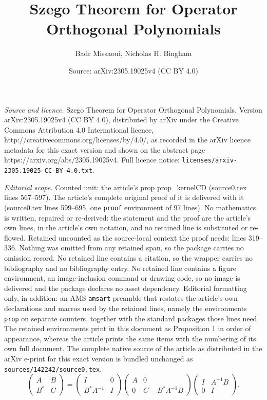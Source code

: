 \documentclass[10pt,a4paper]{amsart}
\title{Szego Theorem for Operator Orthogonal Polynomials}
\author{Badr Missaoui, Nicholas H. Bingham}
\date{Source: arXiv:2305.19025v4 (CC BY 4.0)}
\begin{document}
\maketitle

\noindent\emph{Source and licence.} Szego Theorem for Operator Orthogonal Polynomials. Version arXiv:2305.19025v4 (CC BY 4.0), distributed by arXiv under the Creative Commons Attribution 4.0 International licence, http://creativecommons.org/licenses/by/4.0/, as recorded in the arXiv licence metadata for this exact version and shown on the abstract page https://arxiv.org/abs/2305.19025v4. Full licence notice: \texttt{licenses/arxiv-2305.19025-CC-BY-4.0.txt}.\par\smallskip

\noindent\textit{Editorial scope.} Counted unit: the article's prop prop\_kernelCD (source0.tex lines 567--597). The article's complete original proof of it is delivered with it (source0.tex lines 599--695, one \texttt{proof} environment of 97 lines). No mathematics is written, repaired or re-derived: the statement and the proof are the article's own lines, in the article's own notation, and no retained line is substituted or re-flowed.  Retained uncounted as the source-local context the proof needs: lines 319--336.  Nothing was omitted from any retained span, so the package carries no omission record.  No retained line contains a citation, so the wrapper carries no bibliography and no bibliography entry.  No retained line contains a figure environment, an image-inclusion command or drawing code, so no image is delivered and the package declares no asset dependency.  Editorial formatting only, in addition: an AMS \texttt{amsart} preamble that restates the article's own declarations and macros used by the retained lines, namely the environments \texttt{prop} on separate counters, together with the standard packages those lines need.  The retained environments print in this document as Proposition 1 in order of appearance, whereas the article prints the same items with the numbering of its own full document.  The complete native source of the article as distributed in the arXiv e-print for this exact version is bundled unchanged as \texttt{sources/142242/source0.tex}.
\begin{equation}\label{schurcomplement}
\begin{pmatrix}
A & B\\
B^{*} & C
\end{pmatrix}
=\begin{pmatrix}
I & 0\\
B^{*}A^{-1} & I
\end{pmatrix}
\begin{pmatrix}
A & 0\\
0 & C-B^{*}A^{-1}B
\end{pmatrix}
\begin{pmatrix}
I & A^{-1}B\\
0 & I
\end{pmatrix}.
\end{equation}
\end{document}
